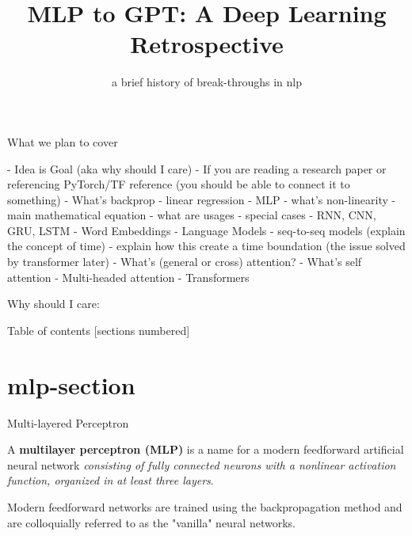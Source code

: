 \documentclass[10pt]{beamer}
\title{MLP to GPT: A Deep Learning Retrospective}
\subtitle{a brief history of break-throughs in nlp}
\begin{document}
\maketitle

\begin{frame}[fragile]{What we plan to cover}

	- Idea is
	Goal (aka why should I care)
	- If you are reading a research paper or referencing PyTorch/TF reference (you should be able to connect it to
	something)
	- What's backprop
	- linear regression
	- MLP
	- what's non-linearity
	- main mathematical equation
	- what are usages
	- special cases
	- RNN, CNN, GRU, LSTM
	- Word Embeddings
	- Language Models
	- seq-to-seq models (explain the concept of time)
	- explain how this create a time boundation (the issue solved by transformer later)
	- What's (general or cross) attention?
	- What's self attention
	- Multi-headed attention
	- Transformers

	Why should I care:

\end{frame}

\begin{frame}{Table of contents}
	[sections numbered]
	\tableofcontents%
\end{frame}

\section[Multi-layered Perceptron]{mlp-section}

\begin{frame}[fragile]{ Multi-layered Perceptron }

	A \textbf{multilayer perceptron (MLP)} is a name for a modern feedforward artificial neural network
	\textit{consisting of fully connected neurons with a nonlinear activation function, organized in at least three
		layers}.


	Modern feedforward networks are trained using the backpropagation method and are colloquially referred to as the
	"vanilla" neural networks.

\end{frame}
\end{document}
